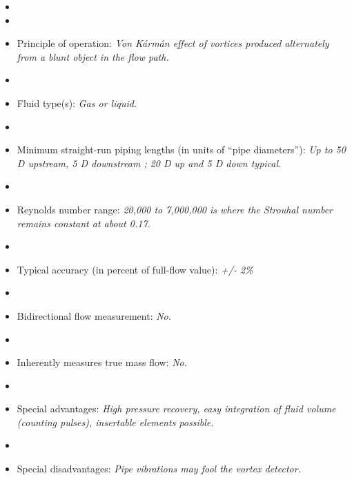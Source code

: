 \documentclass[12pt,a4paper]{article}
\begin{document}
\begin{itemize}
\goodbreak
\item{} 
\vskip 5pt
\item\item{} Principle of operation: {\it Von K\'arm\'an effect of vortices produced alternately from a blunt object in the flow path.}
\vskip 5pt
\item\item{} Fluid type(s): {\it Gas or liquid.}
\vskip 5pt
\item\item{} Minimum straight-run piping lengths (in units of ``pipe diameters''): {\it Up to 50 D upstream, 5 D downstream ; 20 D up and 5 D down typical.}
\vskip 5pt
\item\item{} Reynolds number range: {\it 20,000 to 7,000,000 is where the Strouhal number remains constant at about 0.17.}
\vskip 5pt
\item\item{} Typical accuracy (in percent of full-flow value): {\it +/- 2\%}
\vskip 5pt
\item\item{} Bidirectional flow measurement: {\it No.}
\vskip 5pt
\item\item{} Inherently measures true mass flow: {\it No.}
\vskip 5pt
\item\item{} Special advantages: {\it High pressure recovery, easy integration of fluid volume (counting pulses), insertable elements possible.}
\vskip 5pt
\item\item{} Special disadvantages: {\it Pipe vibrations may fool the vortex detector.}
\end{itemize}
\end{document}
